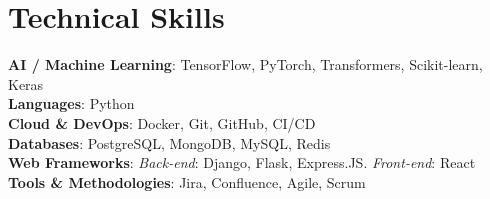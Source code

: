 \documentclass[letterpaper,11pt]{article}
\begin{document}
\section{Technical Skills}

\begin{itemize}[leftmargin=0.15in, label={}]
\small{\item{
    \textbf{AI / Machine Learning}{: TensorFlow, PyTorch, Transformers, Scikit-learn, Keras} \\
    \textbf{Languages}{: Python} \\
    \textbf{Cloud \& DevOps}{: Docker, Git, GitHub, CI/CD} \\
    \textbf{Databases}{: PostgreSQL, MongoDB, MySQL, Redis} \\
    \textbf{Web Frameworks}{: \emph{Back-end}: Django, Flask, Express.JS. \emph{Front-end}: React} \\
    \textbf{Tools \& Methodologies}{: Jira, Confluence, Agile, Scrum}
}}
\end{itemize}

\end{document}
